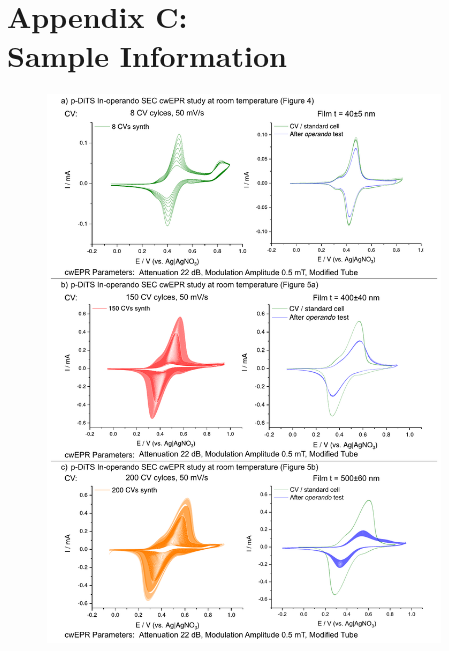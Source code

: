 \chapter*{Appendix C:\\Sample Information}

\label{Sample_info}
\begin{figure}[]
\centering
\includegraphics[width=0.93\textwidth]{./electrochemistry/figures/Figure_S3a}

\end{figure}
\newpage

